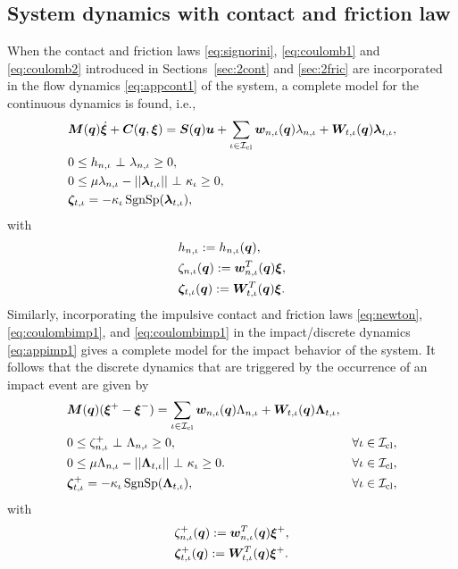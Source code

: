 \documentclass[../DC2017114Bouma.tex]{subfiles}
\begin{document}
\subsection{System dynamics with contact and friction law}\label{sec:2contfric}
When the contact and friction laws \eqref{eq:signorini}, \eqref{eq:coulomb1} and \eqref{eq:coulomb2} introduced in Sections~\ref{sec:2cont} and \ref{sec:2fric} are incorporated in the flow dynamics \eqref{eq:appcont1} of the system, a complete model for the continuous dynamics is found, i.e.,
\begin{align}
&\Mb(\qb)\dot{\xib} + \Cb(\qb,\xib) = \Sb(\qb)\ub + \sum_{\iota\in\Ic_{\text{cl}}}\wb_{n,\iota}(\qb)\lambda_{n,\iota} + \Wb_{t,\iota}(\qb)\lambdab_{t,\iota}, \label{eq:ncpcontact1}\\
&0\leq h_{n,\iota}\ \bot\ \lambda_{n,\iota} \geq 0,\label{eq:ncpcontact2}\\
&0\leq \mu\lambda_{n,\iota} - ||\lambdab_{t,\iota}||\ \bot\ \kappa_{\iota} \geq 0,\label{eq:ncpcontact3}\\
&\zetab_{t,\iota} = -\kappa_{\iota}\SgnSp(\lambdab_{t,\iota}),\label{eq:ncpcontact4}
\end{align}
with 
\begin{align}
&h_{n,\iota} := h_{n,\iota}({\boldsymbol{q}}),\label{eq:h}\\
&\zeta_{n,\iota}({\boldsymbol{q}}) := {\boldsymbol{w}}^T_{n,\iota}({\boldsymbol{q}}) \boldsymbol{\xi},  \label{eq:zetan}\\
&\boldsymbol{\zeta}_{t,\iota}({\boldsymbol{q}}) := {\boldsymbol{W}}^T_{t,\iota}({\boldsymbol{q}}) \boldsymbol{\xi}. \label{eq:zetab}
\end{align}
Similarly, incorporating the impulsive contact and friction laws \eqref{eq:newton}, \eqref{eq:coulombimp1}, and \eqref{eq:coulombimp1} in the impact/discrete dynamics \eqref{eq:appimp1} gives a complete model for the impact behavior of the system. It follows that the discrete dynamics that are triggered by the occurrence of an impact event are given by
\begin{align}
&\Mb(\qb)(\xib^+ - \xib^-) = \sum_{\iota\in\Ic_{\text{cl}}} \wb_{n,\iota}(\qb)\Lambda_{n,\iota} + \Wb_{t,\iota}(\qb)\Lambdab_{t,\iota}, \label{eq:ncpimpact1}\\
&0\leq \zeta_{n,\iota}^+\ \bot\ \Lambda_{n,\iota} \geq 0, &\forall \iota\in\Ic_{\text{cl}},\label{eq:ncpimpact2}\\
&0 \leq \mu\Lambda_{n,\iota} - ||\Lambdab_{t,\iota}||\ \bot\ \kappa_{\iota} \geq 0. &\forall \iota\in\Ic_{\text{cl}},\label{eq:ncpimpact3}\\
&\zetab_{t,\iota}^+ = -\kappa_{\iota}\SgnSp(\Lambdab_{t,\iota}), &\forall \iota\in\Ic_{\text{cl}},\label{eq:ncpimpact4}
\end{align}
with 
\begin{align}
&\zeta^+_{n,\iota}({\boldsymbol{q}}) := {\boldsymbol{w}}^T_{n,\iota}({\boldsymbol{q}}) \boldsymbol{\xi}^+,\\
&\boldsymbol{\zeta}^+_{t,\iota}({\boldsymbol{q}}) := {\boldsymbol{W}}^T_{t,\iota}({\boldsymbol{q}}) \boldsymbol{\xi}^+.\label{eq:ncpimpactend}
\end{align}
\end{document}
